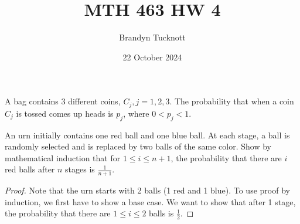 \documentclass{exam}
\title{MTH 463 HW 4}
\author{Brandyn Tucknott}
\date{22 October 2024}
\begin{document}
\maketitle

\begin{questions}
    \question
A bag contains 3 different coins, $C_j, j = 1, 2, 3$. The probability that when a coin $C_j$ is tossed comes up heads is $p_j$, where $0 < p_j < 1$.

\newline


\newpage
\question
An urn initially contains one red ball and one blue ball. At each stage, a ball is randomly selected and is replaced by two balls of the same color. Show by mathematical induction that for $1 \leq i \leq n + 1$, the probability that there are $i$ red balls after $n$ stages is $\frac{1}{n + 1}$.

\begin{proof}
    Note that the urn starts with 2 balls (1 red and 1 blue). To use proof by induction, we first have to show a base case. We want to show that after 1 stage, the probability that there are $1 \leq i \leq 2$ balls is $\frac{1}{2}$.


\end{proof}
\end{questions}
\end{document}
